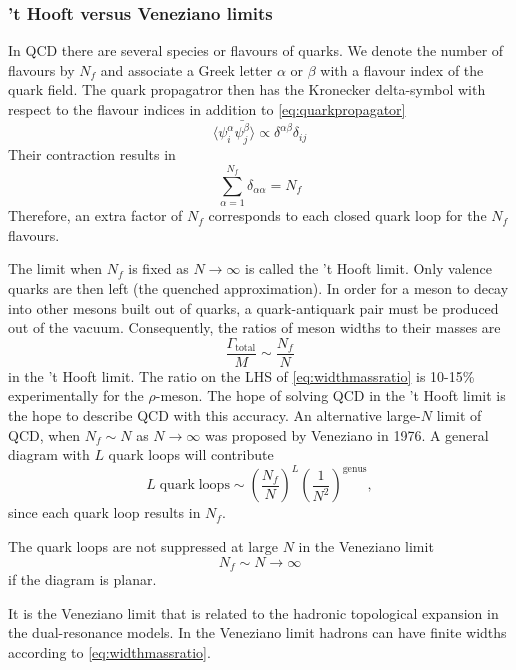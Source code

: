 \subsubsection{'t Hooft versus Veneziano limits}
In QCD there are several species or flavours of quarks. We denote the number
of flavours by $N_f$ and associate a Greek letter $\alpha$ or $\beta$ with a
flavour index of the quark field.
The quark propagatror then has the Kronecker delta-symbol with respect to the
flavour indices in addition to \eqref{eq:quarkpropagator}
\begin{equation}
  \langle\psi^\alpha_i\bar{\psi^\beta_j}\rangle\propto
\delta^{\alpha\beta}\delta_{ij}
\end{equation}
Their contraction results in
\begin{equation}
  \sum_{\alpha=1}^{N_f}\delta_{\alpha\alpha} = N_f
\end{equation}
Therefore,  an extra factor of $N_f$ corresponds to each closed quark loop
for the $N_f$ flavours.
\par The limit when $N_f$ is fixed as $N\rightarrow\infty$ is called the 't
Hooft limit. Only valence quarks are then left (the quenched approximation). 
In order for a meson to decay into other mesons built out of quarks,
a quark-antiquark pair must be produced out of the vacuum. Consequently, the 
ratios of meson widths to their masses are
\begin{equation}
  \frac{\Gamma_{\mathrm{total}}}{M}\sim \frac{N_f}{N}
  \label{eq:widthmassratio}
\end{equation}
in the 't Hooft limit. The ratio on the LHS of \eqref{eq:widthmassratio} is 
10-15\% experimentally for the $\rho$-meson. The hope of solving QCD in the
't Hooft limit is the hope to describe QCD with this accuracy. An alternative
large-$N$ limit of QCD, when $N_f\sim N$ as $N\rightarrow\infty$ was proposed
by Veneziano in 1976. A general diagram with $L$ quark loops will contribute
\begin{equation}
L\;\mathrm{quark\;loops}\sim\left(\frac{N_f}{N}\right)^L\left(\frac{1}{N^2}\right)^\mathrm{genus},
\end{equation}
since each quark loop results in $N_f$.
\par The quark loops are not suppressed at large $N$ in the Veneziano limit
\begin{equation}
N_f\sim N\rightarrow\infty
\end{equation}
if the  diagram is planar. 
\par It is the Veneziano limit that is related to the hadronic topological
expansion in the dual-resonance models. In the Veneziano limit hadrons can have
finite widths according to \eqref{eq:widthmassratio}.

